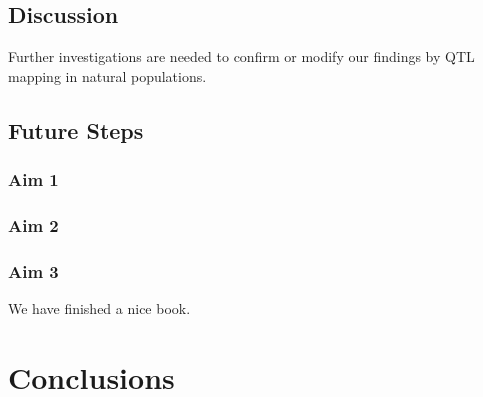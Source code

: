 \documentclass[]{book}
\theoremstyle{definition}
\theoremstyle{definition}
\theoremstyle{remark}
\begin{document}
\section{Discussion}\label{discussion-1}

Further investigations are needed to confirm or modify our findings by
QTL mapping in natural populations.

\section{Future Steps}\label{future-steps}

\subsection{Aim 1}\label{aim-1}

\subsection{Aim 2}\label{aim-2}

\subsection{Aim 3}\label{aim-3}

We have finished a nice book.

\chapter*{Conclusions}\label{conclusions-1}


\end{document}
